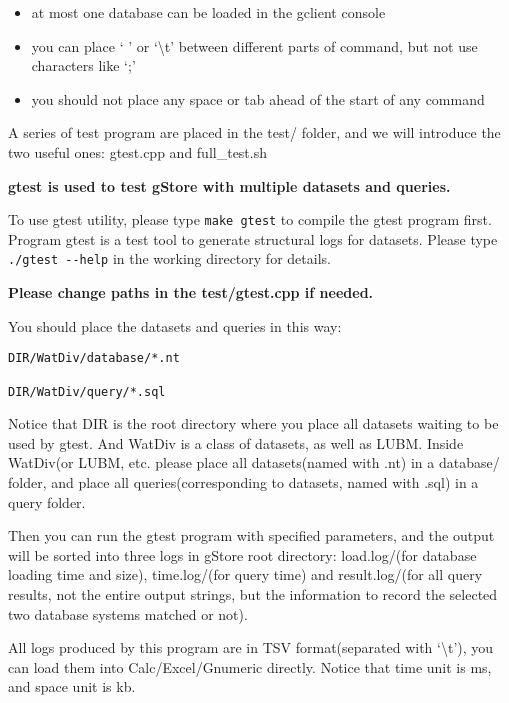 \documentclass[titlepage, a4paper, 12pt]{article}
\begin{document}
\begin{itemize}
\item
  at most one database can be loaded in the gclient console
\item
  you can place ` ' or `\textbackslash{}t' between different parts of
  command, but not use characters like `;'
\item
  you should not place any space or tab ahead of the start of any
  command
\end{itemize}


A series of test program are placed in the test/ folder, and we will
introduce the two useful ones: gtest.cpp and full\_test.sh

\textbf{gtest is used to test gStore with multiple datasets and
queries.}

To use gtest utility, please type \texttt{make\ gtest} to compile the
gtest program first. Program gtest is a test tool to generate structural
logs for datasets. Please type \texttt{./gtest\ -\/-help} in the working
directory for details.

\textbf{Please change paths in the test/gtest.cpp if needed.}

You should place the datasets and queries in this way:

\begin{verbatim}
DIR/WatDiv/database/*.nt

DIR/WatDiv/query/*.sql
\end{verbatim}

Notice that DIR is the root directory where you place all datasets
waiting to be used by gtest. And WatDiv is a class of datasets, as well
as LUBM. Inside WatDiv(or LUBM, etc. please place all datasets(named
with .nt) in a database/ folder, and place all queries(corresponding to
datasets, named with .sql) in a query folder.

Then you can run the gtest program with specified parameters, and the
output will be sorted into three logs in gStore root directory:
load.log/(for database loading time and size), time.log/(for query time)
and result.log/(for all query results, not the entire output strings,
but the information to record the selected two database systems matched
or not).

All logs produced by this program are in TSV format(separated with
`\textbackslash{}t'), you can load them into Calc/Excel/Gnumeric
directly. Notice that time unit is ms, and space unit is kb.
\end{document}
